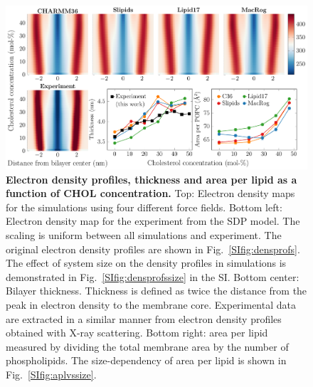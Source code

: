 \documentclass[journal=jctcce]{achemso}
\begin{document}
\begin{figure}[htb!]
  \centering
  \includegraphics[width=\linewidth]{../FIGS/densitymaps.pdf}
  \caption{\label{fig:densmaps}%
  \textbf{Electron density profiles, thickness and area per lipid as a function of CHOL concentration.}
  Top: Electron density maps for the simulations using four different force fields.
  Bottom left: Electron density map for the experiment from the SDP model. The scaling is uniform between all simulations and experiment. The original electron density profiles are shown in Fig.~\ref{SIfig:densprofs}. The effect of system size on the density profiles in simulations is demonstrated in Fig.~\ref{SIfig:densprofssize} in the SI.
  Bottom center: Bilayer thickness. Thickness is defined as twice the distance from the peak in electron density to the membrane core. Experimental data are extracted in a similar manner from electron density profiles obtained with X-ray scattering.
  Bottom right: area per lipid measured by dividing the total membrane area by the number of phospholipids. The size-dependency of area per lipid is shown in Fig.~\ref{SIfig:aplvssize}.
  }
\end{figure}
\end{document}
